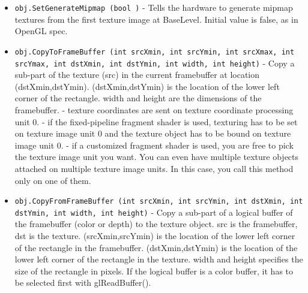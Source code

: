 \begin{itemize}
\item  \verb|obj.SetGenerateMipmap (bool )| -  Tells the hardware to generate mipmap textures from the first texture
 image at BaseLevel.
 Initial value is false, as in OpenGL spec.

\item  \verb|obj.CopyToFrameBuffer (int srcXmin, int srcYmin, int srcXmax, int srcYmax, int dstXmin, int dstYmin, int width, int height)| -  Copy a sub-part of the texture (src) in the current framebuffer
 at location (dstXmin,dstYmin). (dstXmin,dstYmin) is the location of the
 lower left corner of the rectangle. width and height are the dimensions
 of the framebuffer.
 - texture coordinates are sent on texture coordinate processing unit 0.
 - if the fixed-pipeline fragment shader is used, texturing has to be set
 on texture image unit 0 and the texture object has to be bound on texture
 image unit 0.
 - if a customized fragment shader is used, you are free to pick the
 texture image unit you want. You can even have multiple texture objects
 attached on multiple texture image units. In this case, you call this
 method only on one of them.
 
 
 
 
 
 
 
 
 
 
 
 

\item  \verb|obj.CopyFromFrameBuffer (int srcXmin, int srcYmin, int dstXmin, int dstYmin, int width, int height)| -  Copy a sub-part of a logical buffer of the framebuffer (color or depth)
 to the texture object. src is the framebuffer, dst is the texture.
 (srcXmin,srcYmin) is the location of the lower left corner of the
 rectangle in the framebuffer. (dstXmin,dstYmin) is the location of the
 lower left corner of the rectangle in the texture. width and height
 specifies the size of the rectangle in pixels.
 If the logical buffer is a color buffer, it has to be selected first with
 glReadBuffer().
 

\end{itemize}
